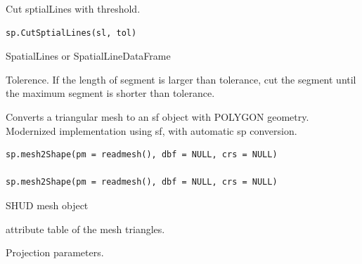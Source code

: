 \documentclass[a4paper]{book}
\begin{document}
%
\begin{Description}\relax
Cut sptialLines with threshold.
\end{Description}
%
\begin{Usage}
\begin{verbatim}
sp.CutSptialLines(sl, tol)
\end{verbatim}
\end{Usage}
%
\begin{Arguments}
\begin{ldescription}
\item[\code{sl}] SpatialLines or SpatialLineDataFrame

\item[\code{tol}] Tolerence. If the length of segment is larger than tolerance, cut the segment until the maximum segment is shorter than tolerance.
\end{ldescription}
\end{Arguments}
%
\begin{Examples}
\end{Examples}
%
\begin{Description}\relax
Converts a triangular mesh to an sf object with POLYGON geometry.
Modernized implementation using sf, with automatic sp conversion.
\end{Description}
%
\begin{Usage}
\begin{verbatim}
sp.mesh2Shape(pm = readmesh(), dbf = NULL, crs = NULL)

sp.mesh2Shape(pm = readmesh(), dbf = NULL, crs = NULL)
\end{verbatim}
\end{Usage}
%
\begin{Arguments}
\begin{ldescription}
\item[\code{pm}] SHUD mesh object

\item[\code{dbf}] attribute table of the mesh triangles.

\item[\code{crs}] Projection parameters.
\end{ldescription}
\end{Arguments}
\end{document}
